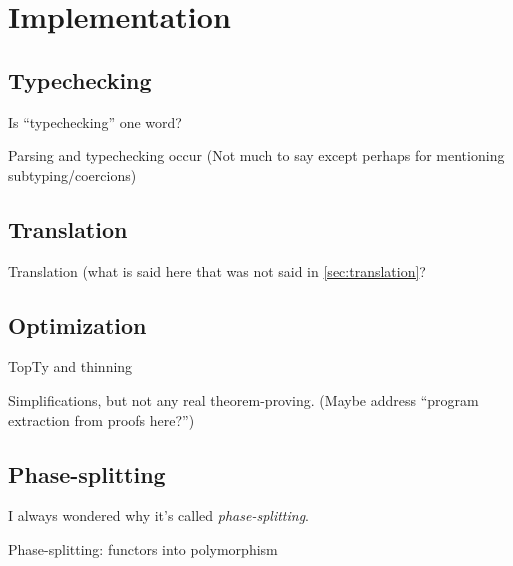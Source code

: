 \section{Implementation}
\label{sec:implementation}


\subsection{Typechecking}
\label{sec:typechecking}

Is ``typechecking'' one word?

Parsing and typechecking occur (Not much to say except perhaps for mentioning subtyping/coercions)


\subsection{Translation}
\label{sec:translation-1}

Translation (what is said here that was not said in \ref{sec:translation}?


\subsection{Optimization}
\label{sec:optimization}

TopTy and thinning

Simplifications, but not any real theorem-proving. (Maybe address
``program extraction from proofs here?'')


\subsection{Phase-splitting}
\label{sec:phase-splitting}

I always wondered why it's called \emph{phase-splitting}.

Phase-splitting:  functors into polymorphism



